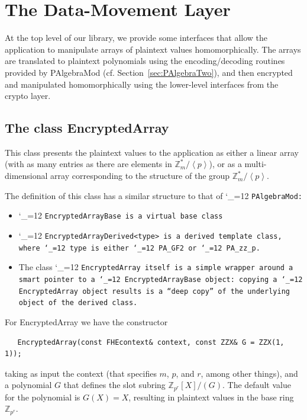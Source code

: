 \documentclass[14pt]{extarticle}
\newcommand{\secref}[1]{Section~\protect\ref{sec:#1}}
\newcommand{\Z}{\mathbb{Z}}
\newcommand{\grp}[1]{\left\langle #1 \right\rangle}
\def\PAlgebraMod{\textsf{PAlgebraMod}}
\def\EncryptedArray{\textsf{EncryptedArray}}
\def\class{%
\begingroup\catcode`\_=12\relax
\classwitharg}
\def\classwitharg#1{\tt #1\endgroup}
\begin{document}
\section{The Data-Movement Layer}\label{sec:dataMove}
At the top level of our library, we provide some interfaces that allow
the application to manipulate arrays of plaintext values homomorphically.
The arrays are translated to plaintext polynomials using the
encoding/decoding routines provided by {\PAlgebraMod}
(cf. \secref{PAlgebraTwo}), and then encrypted and manipulated
homomorphically using the lower-level interfaces from the crypto
layer.

\subsection{The class {\EncryptedArray}}
\label{sec:EncryptedArray}\label{sec:EncryptedArrayModTwoR}
This  class presents the
plaintext values to the application as either a linear array (with
as many entries as there are elements in $\Z_m^*/\grp{p}$), or as
a multi-dimensional array corresponding to the structure of the
group $\Z_m^*/\grp{p}$. 

The definition of this class has a similar structure to that of
\class{PAlgebraMod}:
\begin{itemize}
\item
\class{EncryptedArrayBase} is a virtual base class

\item
\class{EncryptedArrayDerived<type>} is a derived template class, where
\class{type} is either \class{PA_GF2} or \class{PA_zz_p}.

\item
The class \class{EncryptedArray} itself is a simple 
wrapper around a smart pointer to a
\class{EncryptedArrayBase} object: copying a \class{EncryptedArray} 
object results is
a ``deep copy'' of the underlying object of the derived class.
\end{itemize}

\noindent
For {\EncryptedArray} we have the constructor
\begin{verbatim}
   EncryptedArray(const FHEcontext& context, const ZZX& G = ZZX(1, 1));
\end{verbatim}
taking as input the context (that specifies $m$, $p$, and $r$, among
other things), and a polynomial $G$ that defines the slot subring
$\Z_{p^r}[X]/(G)$. The default value for the polynomial is $G(X)=X$,
resulting in plaintext values in the base ring $\Z_{p^r}$.
\end{document}
